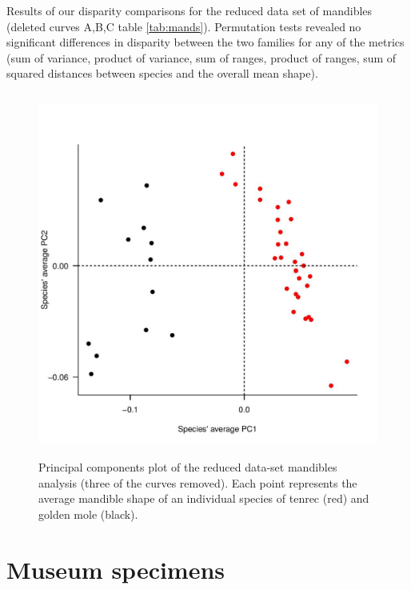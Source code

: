 \documentclass[12pt,a4paper]{article}
\begin{document}
	\begin{table}[h]			
	\centering
	\caption{Results of our disparity comparisons for the reduced data set of mandibles (deleted curves A,B,C table \ref{tab:mands}). Permutation tests revealed no significant differences in disparity between the two families for any of the metrics (sum of variance, product of variance, sum of ranges, product of ranges, sum of squared distances between species and the overall mean shape). }
	
	\label{tab:mands_onecurve} 
	\end{table}

	\begin{figure}[H] 
 	\centering
  	\includegraphics[width=12cm, height=12cm, keepaspectratio=true]
  	{figures/Mandibles_trc+gmole_onecurve_PCA.jpg}
    \caption {Principal components plot of the reduced data-set mandibles analysis (three of the curves removed). Each point represents the average mandible shape of an individual species of tenrec (red) and golden mole (black).}
  	\label{fig:mands_onecurvePCA}
  	\end{figure}

\section{Museum specimens}
	



\end{document}
